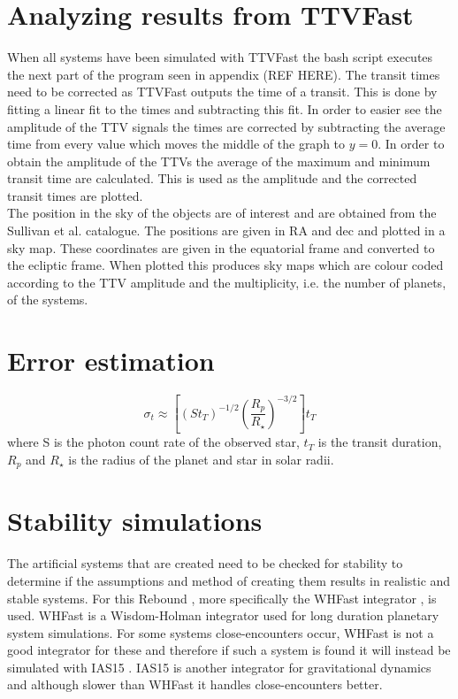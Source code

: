 \documentclass[12pt]{report}
\begin{document}
\section{Analyzing results from TTVFast}
	When all systems have been simulated with TTVFast the bash script executes the next part of the program seen in appendix (REF HERE). The transit times need to be corrected as TTVFast outputs the time of a transit. This is done by fitting a linear fit to the times and subtracting this fit. In order to easier see the amplitude of the TTV signals the times are corrected by subtracting the average time from every value which moves the middle of the graph to $y=0$. In order to obtain the amplitude of the TTVs the average of the maximum and minimum transit time are calculated. This is used as the amplitude and the corrected transit times are plotted. \\
	
	The position in the sky of the objects are of interest and are obtained from the Sullivan et al. catalogue. The positions are given in RA and dec and plotted in a sky map. These coordinates are given in the equatorial frame and converted to the ecliptic frame. When plotted this produces sky maps which are colour coded according to the TTV amplitude and the multiplicity, i.e. the number of planets, of the systems.
	

\section{Error estimation}
\cite{2005Sci...307.1288H}
	\begin{equation}
		\sigma_t \approx \left[\left(S t_T\right)^{-1/2}  \left(\frac{R_p}{R_{\star}}\right)^{-3/2}\right] t_T
	\end{equation}
	where S is the photon count rate of the observed star, $t_T$ is the transit duration, $R_p$ and $R_{\star}$ is the radius of the planet and star in solar radii.
\section{Stability simulations}
	The artificial systems that are created need to be checked for stability to determine if the assumptions and method of creating them results in realistic and stable systems. For this Rebound \citep{2012A&A...537A.128R}, more specifically the WHFast integrator \citep{2015MNRAS.452..376R}, is used. WHFast is a Wisdom-Holman integrator used for long duration planetary system simulations. For some systems close-encounters occur, WHFast is not a good integrator for these and therefore if such a system is found it will instead be simulated with IAS15 \citep{2015MNRAS.446.1424R}. IAS15 is another integrator for gravitational dynamics and although slower than WHFast it handles close-encounters better.
	
\end{document}
